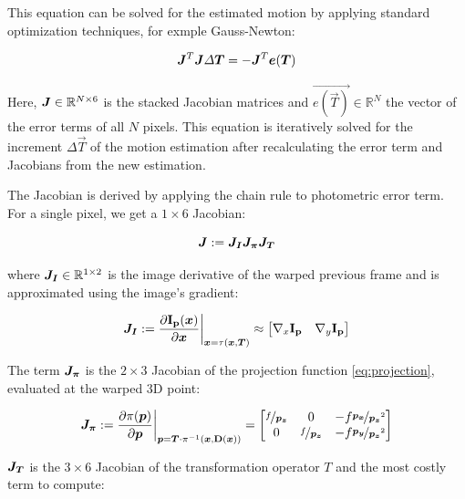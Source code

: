 This equation can be solved for the estimated motion by applying standard
optimization techniques, for exmple Gauss-Newton:

\begin{equation}
    \mat{J}^T \mat{J} \Delta \vec{T} = - \mat{J}^T \vec{e(\vec{T})}
\end{equation}

Here, $\mat{J} \in \mathbb{R}^{N \times 6}$ is the stacked Jacobian matrices
and $\vec{e(\vec{T})} \in \mathbb{R}^N$ the vector of the error terms of all
$N$ pixels.  This equation is iteratively solved for the increment $\Delta
\vec{T}$ of the motion estimation after recalculating the error term and
Jacobians from the new estimation.

The Jacobian is derived by applying the chain rule to photometric error term.
For a single pixel, we get a $1 \times 6$ Jacobian:

\begin{equation}
    \mat{J} := \mat{J_I} \mat{J_{\pi}} \mat{J_T}
\end{equation}

where $\mat{J_I} \in \mathbb{R}^{1 \times 2}$ is the image derivative of the warped previous frame and is
approximated using the image's gradient:

\begin{equation}
    \mat{J_I} := \frac{\partial \mathbf{I_p}(\vec{x})} {\partial \vec{x}} \bigg|_{\vec{x} = \tau(\vec{x}, \vec{T})}
    \approx
    \begin{bmatrix}
        \nabla{}_x \mathbf{I_p} & \nabla{}_y \mathbf{I_p}
    \end{bmatrix}
\end{equation}

The term $\mat{J_{\pi}}$ is the $2 \times 3$ Jacobian of the projection
function \ref{eq:projection}, evaluated at the warped 3D point:

\begin{equation}
    \mat{J_{\pi}} := \frac{\partial \pi(\vec{p})}{\partial \vec{p}}
    \bigg|_{\vec{p} = \vec{T}\cdot\pi^{-1}(\vec{x},\mathbf{D}(\vec{x}))}
    =
    \begin{bmatrix}
        \nicefrac{f}{\vec{p_z}} & 0 & -f \nicefrac{\vec{p_x}}{\vec{p_z}^2} \\
        0 & \nicefrac{f}{\vec{p_z}} & -f \nicefrac{\vec{p_y}}{\vec{p_z}^2}
    \end{bmatrix}
\end{equation}

$\mat{J_T}$ is the $3 \times 6$ Jacobian of the transformation operator $T$ and
the most costly term to compute:

